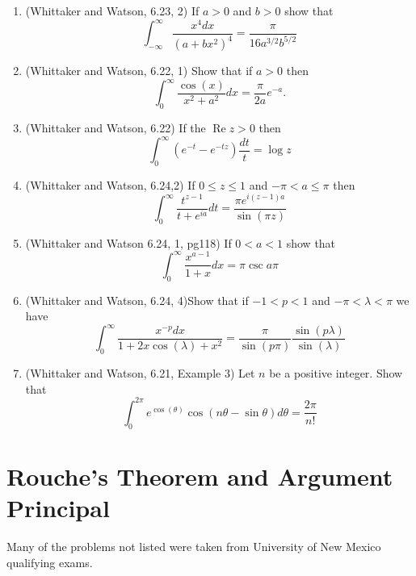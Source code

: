 \documentclass[a4paper,10pt]{article}
\renewcommand{\Re}{\operatorname{Re}}
\begin{document}
\begin{enumerate}
	\item (Whittaker and Watson, 6.23, 2) If $a>0$ and $b>0$ show that 
	$$ \int_{-\infty}^{\infty} \frac{x^4dx}{(a+bx^2)^4} = \frac{\pi}{16 a^{3/2}b^{5/2}}$$
	
	\item (Whittaker and Watson, 6.22, 1) Show that if $a>0$ then 
	$$ \int_0^{\infty} \frac{\cos(x)}{x^2+a^2}dx = \frac{\pi}{2a}e^{-a}. $$
	
	
	\item (Whittaker and Watson, 6.22)
	If the $\Re z >0$ then 
	$$ \int_0^{\infty} (e^{-t} - e^{-tz}) \frac{dt}{t} = \log z $$
	
	\item (Whittaker and Watson, 6.24,2) If $0 \leq z \leq 1$ and $-\pi< a \leq \pi$ then
	$$\int_0^{\infty} \frac{t^{z-1}}{t + e^{ia} }dt  = \frac{\pi e^{i(z-1)a}}{\sin(\pi z)} $$
	
	
	\item (Whittaker and Watson 6.24, 1, pg118)
	If $0<a<1$ show that 
	$$ \int_0^{\infty} \frac{x^{a-1}}{1+x}dx = \pi \csc a \pi $$
	
	
	\item (Whittaker and Watson, 6.24, 4)Show that if $-1<p<1$ and $-\pi<\lambda<\pi$ we have 
	$$ \int_0^{\infty} \frac{x^{-p} dx}{1 + 2x \cos(\lambda) + x^2 } = \frac{\pi}{\sin(p\pi)} \frac{\sin(p\lambda)}{\sin(\lambda)}$$
	
	\item  (Whittaker and Watson, 6.21, Example 3)
	Let $n$ be a positive integer. 
	Show that 
	$$ \int_0^{2\pi} e^{\cos(\theta)} \cos(n\theta - \sin\theta)d\theta = \frac{2\pi}{n!}$$
	
\end{enumerate}

\section{Rouche's Theorem and Argument Principal}

Many of the problems not listed were taken from University of New Mexico qualifying exams. 
\end{document}
